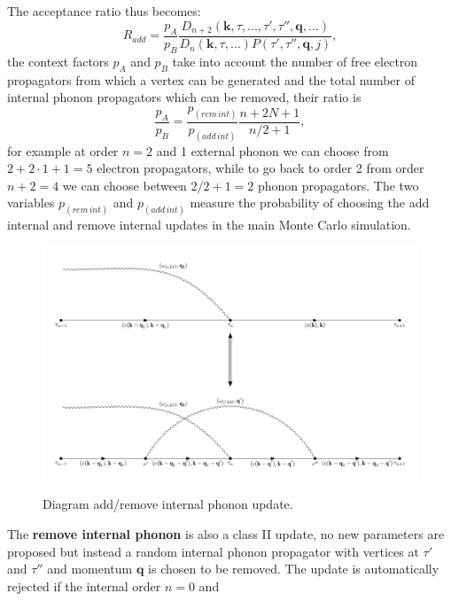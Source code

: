 The acceptance ratio thus becomes:
\begin{equation}
    R_{add}=\frac{p_A}{p_B}\frac{D_{n+2}(\mathbf{k},\tau,...,\tau',\tau'',\mathbf{q},...)}{D_n(\mathbf{k},\tau,...)P(\tau',\tau'',\mathbf{q},j)},
\end{equation}
the context factors $p_A$ and $p_B$ take into account the number of free electron propagators from which a vertex can be generated and the total number of internal phonon propagators 
which can be removed, their ratio is
\begin{equation}
    \frac{p_A}{p_B}=\frac{p_{(rem\hspace{2pt}int)}}{p_{(add\hspace{2pt}int)}}\frac{n+2N+1}{n/2+1},
\end{equation}
for example at order $n=2$ and 1 external phonon we can choose from $2+2\cdot1+1=5$ electron propagators, while to go back to 
order 2 from order $n+2=4$ we can choose between $2/2+1=2$ phonon propagators. The two variables $p_{(rem\hspace{2pt}int)}$ and 
$p_{(add\hspace{2pt}int)}$ measure the probability of choosing the add internal and remove internal updates in the main Monte Carlo simulation.
\begin{figure}[H]
    \centering
    \includegraphics[scale=0.6]{add_update.pdf}
    \label{fig:add_update}
    \caption{Diagram add/remove internal phonon update.}
\end{figure}
The \textbf{remove internal phonon} is also a class II update, no new parameters are proposed but instead a random internal phonon propagator with 
vertices at $\tau'$ and $\tau''$ and momentum $\mathbf{q}$ is chosen to be removed. The update is automatically rejected if the internal order $n=0$ and 
